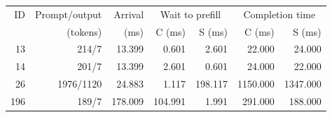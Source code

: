 \begin{tabular}{rrrrrrr}\toprule
ID & Prompt/output & Arrival & \multicolumn{2}{c}{Wait to prefill} & \multicolumn{2}{c}{Completion time} \\
 & (tokens) & (ms) & C (ms) & S (ms) & C (ms) & S (ms) \\ \midrule
13 & 214/7 & 13.399 & 0.601 & 2.601 & 22.000 & 24.000 \\
14 & 201/7 & 13.399 & 2.601 & 0.601 & 24.000 & 22.000 \\
26 & 1976/1120 & 24.883 & 1.117 & 198.117 & 1150.000 & 1347.000 \\
196 & 189/7 & 178.009 & 104.991 & 1.991 & 291.000 & 188.000 \\
\bottomrule\end{tabular}

